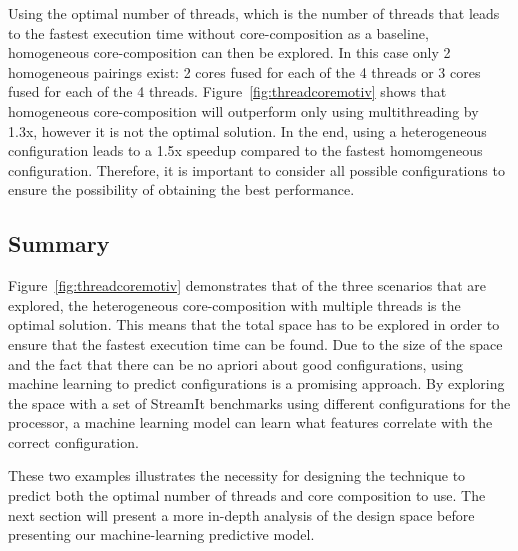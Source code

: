 Using the optimal number of threads, which is the number of threads that leads to the fastest execution time without core-composition as a baseline, homogeneous core-composition can then be explored.
In this case only 2 homogeneous pairings exist: 2 cores fused for each of the 4 threads or 3 cores fused for each of the 4 threads.
Figure~\ref{fig:threadcoremotiv} shows that homogeneous core-composition will outperform only using multithreading by 1.3x, however it is not the optimal solution.
In the end, using a heterogeneous configuration leads to a 1.5x speedup compared to the fastest homomgeneous configuration.
Therefore, it is important to consider all possible configurations to ensure the possibility of obtaining the best performance.

\subsection{Summary}
Figure~\ref{fig:threadcoremotiv} demonstrates that of the three scenarios that are explored, the heterogeneous core-composition with multiple threads is the optimal solution.
This means that the total space has to be explored in order to ensure that the fastest execution time can be found.
Due to the size of the space and the fact that there can be no apriori about good configurations, using machine learning to predict configurations is a promising approach. %
By exploring the space with a set of StreamIt benchmarks using different configurations for the processor, a machine learning model can learn what features correlate with the correct configuration.

These two examples illustrates the necessity for designing the technique to predict both the optimal number of threads and core composition to use.
The next section will present a more in-depth analysis of the design space before presenting our machine-learning predictive model.
